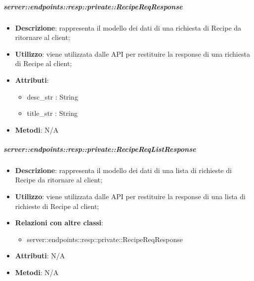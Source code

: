     \subparagraph{server::endpoints::resp::private::RecipeReqResponse} %
    \label{subp:bdsm_app_server_endpoints_resp_private_recipereqresponse}
    \begin{itemize}
      \item \textbf{Descrizione}: rappresenta il modello dei dati di una richiesta di Recipe da ritornare al client;
      \item \textbf{Utilizzo}: viene utilizzata dalle API per restituire la response di una richiesta di Recipe al client;
	  \item \textbf{Attributi}:  
	  	\begin{itemize}
	  		\item desc\_str : String
	  		\item title\_str : String
	  	\end{itemize}
	  \item \textbf{Metodi}: N/A
      \end{itemize}

    \subparagraph{server::endpoints::resp::private::RecipeReqListResponse} %
    \label{subp:bdsm_app_server_endpoints_resp_private_recipereqlistresponse}
    \begin{itemize}
      \item \textbf{Descrizione}: rappresenta il modello dei dati di una lista di richieste di Recipe da ritornare al client;
      \item \textbf{Utilizzo}: viene utilizzata dalle API per restituire la response di una lista di richieste di Recipe al client;
      \item \textbf{Relazioni con altre classi}:
        \begin{itemize}
          \item server::endpoints::resp::private::RecipeReqResponse
        \end{itemize}
	  \item \textbf{Attributi}: N/A
	  \item \textbf{Metodi}: N/A
      \end{itemize}

